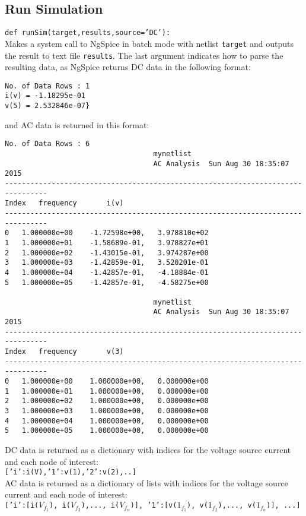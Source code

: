 \documentclass[11pt,twoside]{mitthesis}
\begin{document}
\subsection{Run Simulation}
\texttt{def runSim(target,results,source='DC'):}\\
Makes a system call to NgSpice in batch mode with netlist \texttt{target} and outputs the result to text file \texttt{results}.
The last argument indicates how to parse the resulting data, as NgSpice returns DC data in the following format:
\begin{Verbatim}[fontsize=\footnotesize]
No. of Data Rows : 1
i(v) = -1.18295e-01
v(5) = 2.532846e-07}
\end{Verbatim}
and AC data is returned in this format:
\begin{Verbatim}[fontsize=\footnotesize]
No. of Data Rows : 6
                                   mynetlist
                                   AC Analysis  Sun Aug 30 18:35:07  2015
--------------------------------------------------------------------------------
Index   frequency       i(v)                            
--------------------------------------------------------------------------------
0	1.000000e+00	-1.72598e+00,	3.978810e+02	
1	1.000000e+01	-1.58689e-01,	3.978827e+01	
2	1.000000e+02	-1.43015e-01,	3.974287e+00	
3	1.000000e+03	-1.42859e-01,	3.520201e-01	
4	1.000000e+04	-1.42857e-01,	-4.18884e-01	
5	1.000000e+05	-1.42857e-01,	-4.58275e+00	

                                   mynetlist
                                   AC Analysis  Sun Aug 30 18:35:07  2015
--------------------------------------------------------------------------------
Index   frequency       v(3)                            
--------------------------------------------------------------------------------
0	1.000000e+00	1.000000e+00,	0.000000e+00	
1	1.000000e+01	1.000000e+00,	0.000000e+00	
2	1.000000e+02	1.000000e+00,	0.000000e+00	
3	1.000000e+03	1.000000e+00,	0.000000e+00	
4	1.000000e+04	1.000000e+00,	0.000000e+00	
5	1.000000e+05	1.000000e+00,	0.000000e+00
\end{Verbatim}
DC data is returned as a dictionary with indices for the voltage source current and each node of interest:\\ \texttt{['i':i(V),'1':v(1),'2':v(2),..]}\\
AC data is returned as a dictionary of lists with indices for the voltage source current and each node of interest:\\ \texttt{['i':[i($V_{f_1}$), i($V_{f_2}$),..., i($V_{f_n}$)], '1':[v($1_{f_1}$), v($1_{f_2}$),..., v($1_{f_n}$)], ...]}
\end{document}
